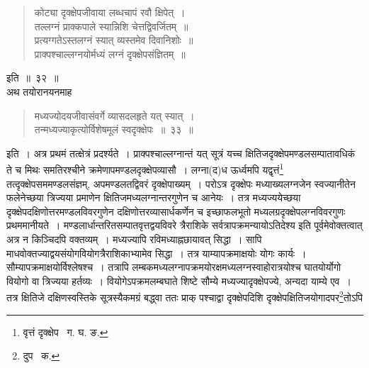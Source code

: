 \documentclass[11pt, openany]{book}
\begin{document}
\newpage

\begin{quote}
{\qt कोट्या दृक्क्षेपजीवाया लब्धचापं रवौ क्षिपेत्~। \\
 तल्लग्नं प्राक्कपाले स्यान्निशि चेत्तद्विवर्जितम्~॥ \\
 प्रत्यग्गतेऽस्तलग्नं स्यात् व्यस्तमेव दिवानिशोः~॥ \\
 प्राक्पश्चाल्लग्नयोर्मध्यं लग्नं दृक्क्षेपसंज्ञितम्~॥} 
\end{quote}
\noindent इति~॥~३२~॥\\

\indent अथ तयोरानयनमाह\textendash 
\begin{quote}
{\ab मध्यज्योदयजीवासंवर्गे व्यासदलहृते यत् स्यात्~। \\
 तन्मध्यज्याकृत्योर्विशेषमूलं स्वदृक्क्षेपः~॥~३३~॥} 
\end{quote}

\indent इति~। अत्र प्रथमं तत्क्षेत्रं प्रदर्श्यते~। प्राक्पश्चाल्लग्नान्तं यत् सूत्रं यच्च क्षितिजदृक्क्षेपमण्डलसम्पातावधिकं ते च मिथः समतिरश्चीने क्रमेणापमण्डलदृक्क्षेपव्यासौ~। लग्ना(द)ध ऊर्ध्वमपि यद्वृत्तं\renewcommand{\thefootnote}{१}\footnote{वृत्तं दृक्क्षेप \textendash\ ग. घ. ङ.} तत्दृक्क्षेपसममण्डलसंज्ञम्, अपमण्डलतद्विवरं दृक्क्षेपाख्यम्~। परोऽत्र दृक्क्षेपः मध्याख्यलग्नजेन स्वज्यानीतेन फलेनेच्छया त्रिज्यया प्रमाणेन क्षितिजमध्यलग्नान्तरगुणेन च आनेयः~। तत्र मध्यज्ययेच्छया दृक्क्षेपदक्षिणोत्तरमण्डलविवरगुणेन दक्षिणोत्तरव्यासार्धकर्णेन च इच्छाफलभूतो मध्यलग्रदृक्क्षेपलग्नविवरगुणः प्रथममानीयते~। मण्डलार्धान्तरितसम्पातवृत्तद्वयविवरे त्रैराशिके सर्वत्रापक्रमन्यायोऽतिदेश्य इति
पूर्वमेवोक्तत्वात् अत्र न किञ्चिदपि वक्तव्यम्~। मध्यज्यापि रविमध्याह्नछायावत् सिद्धा~। सापि माधवोक्तज्याद्वयसंयोगवियोगत्रैराशिकाभ्यामेव सिद्धा~। तत्र याम्यापक्रमाक्षयोः योगः कार्यः~। सौम्यापक्रमाक्षयोर्विश्लेषश्च~। तत्रापि लम्बकमध्यलग्नापक्रमयोरक्षमध्यलग्नस्वाहोरात्रयोश्च घातयोर्योगो वियोगो वा त्रिज्यया हर्तव्यः~। वियोगेऽपक्रमलम्बघाते शिष्टे सौम्ये मध्यज्यादृक्क्षेपज्ये, अन्यदा याम्ये एव~। तत्र क्षितिजे दक्षिणस्वस्तिके
सूत्रस्यैकमग्रं बद्ध्वा ततः प्राक् पश्चाद्वा दृक्क्षेपदिशि दृक्क्षेपक्षितिजयोगादपर\renewcommand{\thefootnote}{२}\footnote{दुप \textendash\ क.}तोऽपि

\newpage
\end{document}
